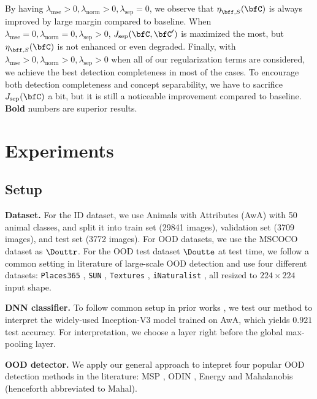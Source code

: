 \begin{table}[tb]
{	By having $\lambda_\textrm{mse} > 0, \lambda_\textrm{norm} > 0, \lambda_\textrm{sep} = 0$, we observe that $\eta^{}_{\bff, S}(\bfC)$ is always improved by large margin compared to baseline.
	When $\lambda_\textrm{mse} = 0, \lambda_\textrm{norm} = 0, \lambda_\textrm{sep} > 0$, $J_{\textrm{sep}}(\bfC, \bfC')$ is maximized the most, but $\eta^{}_{\bff, S}(\bfC)$ is not enhanced or even degraded.
	Finally, with $\lambda_\textrm{mse} > 0, \lambda_\textrm{norm} > 0, \lambda_\textrm{sep} > 0$ when all of our regularization terms are considered, we achieve the best detection completeness in most of the cases.
	To encourage both detection completeness and concept separability, we have to sacrifice $J_{\textrm{sep}}(\bfC)$ a bit, but it is still a noticeable improvement compared to baseline.
	\textbf{Bold} numbers are superior results.}
	\label{tab:concept-learning-results}
\end{table}

\section{Experiments}
\subsection{Setup}
\textbf{Dataset.} For the ID dataset, we use Animals with Attributes (AwA) \cite{xian2018awa} with 50 animal classes, and split it into train set (29841 images), validation set (3709 images), and test set (3772 images).
For OOD datasets, we use the MSCOCO dataset \cite{lin2014mscoco} as $\Douttr$.
For the OOD test dataset $\Doutte$ at test time, we follow a common setting in literature of large-scale OOD detection and use four different datasets: \texttt{Places365} \cite{zhou2017places}, \texttt{SUN} \cite{xiao2010sun}, \texttt{Textures} \cite{cimpoi2014textures}, \texttt{iNaturalist} \cite{van2018inaturalist}, all resized to $224 \times 224$ input shape.

\textbf{DNN classifier.} To follow common setup in prior works \cite{yeh2019completeness, ghorbani2019ace, koh2020concept-bottleneck, kim2018tcav}, we test our method to interpret the widely-used Inception-V3 model \cite{szegedy2016inception-v3} trained on AwA, which yields $0.921$ test accuracy. 
For interpretation, we choose a layer right before the global max-pooling layer. 

\textbf{OOD detector.} We apply our general approach to intepret four popular OOD detection methods in the literature: MSP \cite{hendrycks2016msp}, ODIN \cite{liang2018ODIN}, Energy \cite{liu2020energy} and Mahalanobis \cite{lee2018mahalanobis} (henceforth abbreviated to Mahal). 

